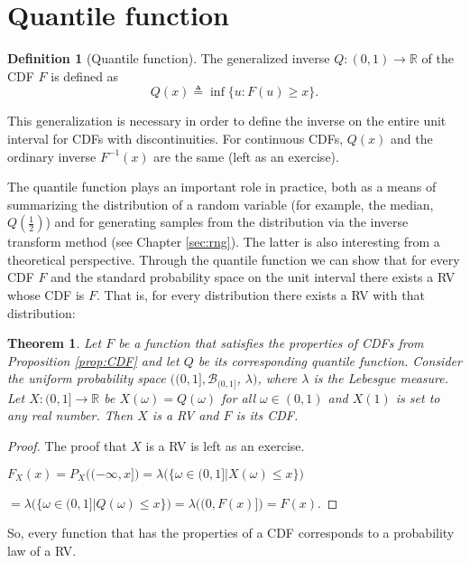 \documentclass{book}
\theoremstyle{plain}%
\newtheorem{theorem}{Theorem}[section]
\theoremstyle{definition}
\newtheorem{definition}{Definition}[section]
\newlength{\arrow}
\begin{document}
\section{Quantile function}

\begin{definition}[Quantile function]
The generalized inverse $Q: (0, 1) \rightarrow \mathbb{R}$ of the CDF $F$ is defined as
$$Q(x) \triangleq \inf\{u: F(u) \geq x\}.$$\label{def:geninverse}
\end{definition}

This generalization is necessary in order to define the inverse on the entire unit interval for CDFs with discontinuities. For continuous CDFs, $Q(x)$ and the ordinary inverse $F^{-1}(x)$ are the same (left as an exercise).

The quantile function plays an important role in practice, both as a means of summarizing the distribution of a random variable (for example, the median, $Q(\frac{1}{2})$) and for generating samples from the distribution via the inverse transform method (see Chapter \ref{sec:rng}). The latter is also interesting from a theoretical perspective. Through the quantile function we can show that for every CDF $F$ and the standard probability space on the unit interval there exists a RV whose CDF is $F$. That is, for every distribution there exists a RV with that distribution:

\begin{theorem}
Let $F$ be a function that satisfies the properties of CDFs from Proposition \ref{prop:CDF} and let $Q$ be its corresponding quantile function. Consider the uniform probability space $((0,1], \mathcal{B}_{(0,1]}$, $\lambda)$, where $\lambda$ is the Lebesgue measure. Let $X: (0,1] \rightarrow \mathbb{R}$ be $X(\omega) = Q(\omega)$ for all $\omega \in (0, 1)$ and $X(1)$ is set to any real number. Then $X$ is a RV and $F$ is its CDF.\label{thm:CDF-RV}
\end{theorem}

\begin{proof}
The proof that $X$ is a RV is left as an exercise.

$F_X(x) = P_X\bigg((-\infty, x]\bigg) = \lambda\bigg(\{\omega \in (0,1] | X(\omega) \leq x\}\bigg)$

$= \lambda\bigg(\{\omega \in (0,1] | Q(\omega) \leq x\}\bigg) = \lambda\bigg((0, F(x)]\bigg) = F(x).$
\end{proof}
 
So, every function that has the properties of a CDF corresponds to a probability law of a RV.
\end{document}
